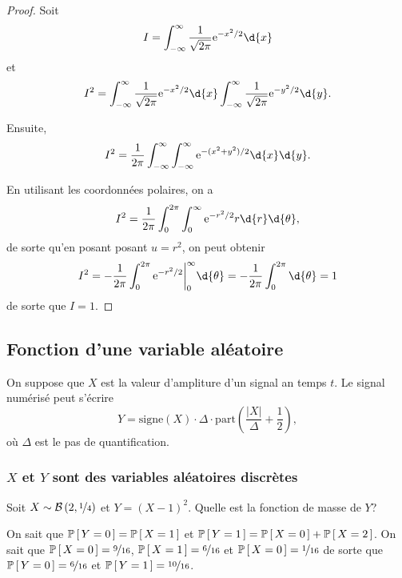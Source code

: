 \documentclass[11pt]{article}
\renewcommand\P[1]{%
	\ensuremath{%
		\mathbb{P}\left[\,#1\,\right]%
	}%
}%
\newcommand\e{%
	\ensuremath{%
		\mathrm{e}%
	}%
}%
\newcommand\Bin[2]{%
	\ensuremath{%
		\mathcal{B}\left(#1,#2\right)%
	}%
}%
\begin{document}
\begin{proof}
	Soit
	\begin{equation*}
		I=\int_{-\infty}^\infty\frac{1}{\sqrt{2\pi}}\e^{-x^2/2}\d{x}
	\end{equation*}
	et
	\begin{equation*}
		I^2=
			\int_{-\infty}^\infty\frac{1}{\sqrt{2\pi}}\e^{-x^2/2}\d{x}
			\int_{-\infty}^\infty\frac{1}{\sqrt{2\pi}}\e^{-y^2/2}\d{y}.
	\end{equation*}

	Ensuite,
	\begin{equation*}
		I^2=\frac{1}{2\pi}\int_{-\infty}^\infty\int_{-\infty}^\infty
			\e^{-(x^2+y^2)/2}\d{x}\d{y}.
	\end{equation*}

	En utilisant les coordonnées polaires, on a
	\begin{equation*}
		I^2=\frac{1}{2\pi}\int_0^{2\pi}\int_0^\infty
			\e^{-r^2/2}r\d{r}\d{\theta},
	\end{equation*}
	de sorte qu'en posant posant $u=r^2$, on peut obtenir
	\begin{equation*}
		I^2=-\frac{1}{2\pi}\int_0^{2\pi}
			\e^{-r^2/2}\bigg\rvert_0^\infty\d{\theta}=
		-\frac{1}{2\pi}\int_0^{2\pi}\d{\theta}=1
	\end{equation*}
	de sorte que $I=1$.
\end{proof}

\subsection{Fonction d'une variable aléatoire}
\begin{exemple}
	On suppose que $X$ est la valeur d'ampliture d'un signal an temps $t$. Le
	signal numérisé peut s'écrire
	\begin{equation*}
		Y=\mathrm{signe}(X)\cdot\Delta\cdot\mathrm{part}\left(
			\frac{|X|}{\Delta}+\frac{1}{2}
		\right),
	\end{equation*}
	où $\Delta$ est le pas de quantification.
\end{exemple}

\subsubsection{$X$ et $Y$ sont des variables aléatoires discrètes}
%
%
\begin{exemple}
	Soit $X\sim\Bin{2}{\nicefrac{1}{4}}$ et $Y=(X-1)^2$. Quelle est la fonction
	de masse de $Y$?

	On sait que $\P{Y=0}=\P{X=1}$ et $\P{Y=1}=\P{X=0}+\P{X=2}$. On sait que
	$\P{X=0}=\nicefrac{9}{16}$, $\P{X=1}=\nicefrac{6}{16}$ et $\P{X=0}=
	\nicefrac{1}{16}$ de sorte que $\P{Y=0}=\nicefrac{6}{16}$ et
	$\P{Y=1}=\nicefrac{10}{16}$.
\end{exemple}
\end{document}
